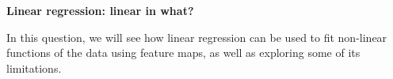 \item {} {\bf Linear regression: linear in what?}

In this question, we will see how linear regression can be used to fit non-linear functions of the data using feature maps, as well as exploring some of its limitations.

\begin{enumerate}
	
        \ifnum{} {
	  
        }\fi

	
        \ifnum{} {
	  
        }\fi

	
        \ifnum{} {
	  
        }\fi

        
        \ifnum{} {
	  
        }\fi

        
        \ifnum{} {
	  
        }\fi
\end{enumerate}
